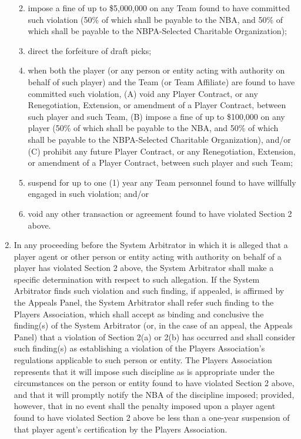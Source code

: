 \documentclass[
]{book}
\providecommand{\tightlist}{%
  \setlength{\itemsep}{0pt}\setlength{\parskip}{0pt}}
\begin{document}
\begin{enumerate}
  \begin{enumerate}
  \def\labelenumii{(\roman{enumii})}
  \tightlist
  \item
    impose a fine of up to \$5,000,000 on any Team found to have committed such violation (50\% of which shall be payable to the NBA, and 50\% of which shall be payable to the NBPA-Selected Charitable Organization);
  \item
    direct the forfeiture of draft picks;
  \item
    when both the player (or any person or entity acting with authority on behalf of such player) and the Team (or Team Affiliate) are found to have committed such violation, (A) void any Player Contract, or any Renegotiation, Extension, or amendment of a Player Contract, between such player and such Team, (B) impose a fine of up to \$100,000 on any player (50\% of which shall be payable to the NBA, and 50\% of which shall be payable to the NBPA-Selected Charitable Organization), and/or (C) prohibit any future Player Contract, or any Renegotiation, Extension, or amendment of a Player Contract, between such player and such Team;
  \item
    suspend for up to one (1) year any Team personnel found to have willfully engaged in such violation; and/or
  \item
    void any other transaction or agreement found to have violated Section 2 above.
  \end{enumerate}
\item
  In any proceeding before the System Arbitrator in which it is alleged that a player agent or other person or entity acting with authority on behalf of a player has violated Section 2 above, the System Arbitrator shall make a specific determination with respect to such allegation. If the System Arbitrator finds such violation and such finding, if appealed, is affirmed by the Appeals Panel, the System Arbitrator shall refer such finding to the Players Association, which shall accept as binding and conclusive the finding(s) of the System Arbitrator (or, in the case of an appeal, the Appeals Panel) that a violation of Section 2(a) or 2(b) has occurred and shall consider such finding(s) as establishing a violation of the Players Association's regulations applicable to such person or entity. The Players Association represents that it will impose such discipline as is appropriate under the circumstances on the person or entity found to have violated Section 2 above, and that it will promptly notify the NBA of the discipline imposed; provided, however, that in no event shall the penalty imposed upon a player agent found to have violated Section 2 above be less than a one-year suspension of that player agent's certification by the Players Association.
\end{enumerate}
\end{document}

